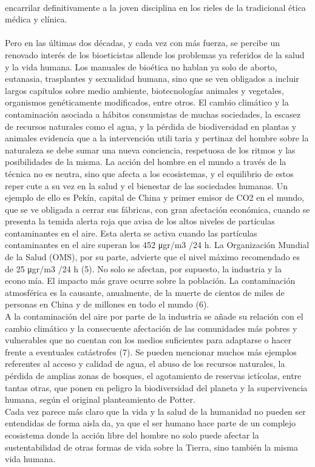 \documentclass[12pt,letterpaper]{article}
\begin{document}
\begin{multicols}{2}
\\
\noindent encarrilar definitivamente a la joven disciplina en los rieles de la tradicional ética médica y clínica.
\\
\\
Pero en las últimas dos décadas, y cada vez con más 
fuerza, se percibe un renovado interés de los bioeticistas allende los problemas ya referidos de la salud y la vida humana. Los manuales de bioética no hablan ya solo de aborto, eutanasia, trasplantes y sexualidad humana, sino que se ven obligados a incluir largos capítulos sobre medio ambiente, biotecnologías animales y vegetales, organismos genéticamente modificados, entre otros. El cambio climático y la contaminación asociada a hábitos 
consumistas de muchas sociedades, la escasez de recursos naturales como el agua, y la pérdida de biodiversidad en plantas y animales evidencia que a la intervención utilitaria y pertinaz del hombre sobre la naturaleza se debe sumar una nueva conciencia, respetuosa de los ritmos y las posibilidades de la misma. La acción del hombre en el mundo a través de la técnica no es neutra, sino que afecta a los ecosistemas, y el equilibrio de estos repercute a su vez en la salud y el bienestar de las sociedades humanas. Un ejemplo de ello es Pekín, capital de China y primer emisor de CO2 en el mundo, que se ve obligada a cerrar sus fábricas, con gran afectación económica, cuando se presenta la temida alerta roja que avisa de los altos niveles de partículas contaminantes en el aire. Esta alerta se activa cuando las partículas contaminantes en el aire superan los 452 μgr/m3
/24 h. La Organización Mundial de la Salud (OMS), por su parte, advierte que el nivel máximo recomendado es de 25 μgr/m3
/24 h (5). No solo se afectan, por supuesto, la industria y la economía. El impacto más grave ocurre sobre la población. La contaminación atmosférica es la causante, anualmente, de la muerte de cientos de miles de personas en China y de millones en todo el mundo (6).
\\

\noindent A la contaminación del aire por parte de la industria se añade su relación con el cambio climático y la consecuente afectación de las comunidades más pobres y vulnerables que no cuentan con los medios suficientes para adaptarse o hacer frente a eventuales catástrofes (7). Se pueden mencionar muchos más ejemplos referentes al acceso y calidad de agua, el abuso de los recursos naturales, la pérdida de amplias zonas de bosques, el agotamiento de reservas ictícolas, entre tantas otras, que ponen en peligro la biodiversidad del planeta y la supervivencia humana, según el original planteamiento de Potter.
\\

\noindent Cada vez parece más claro que la vida y la salud de la humanidad no pueden ser entendidas de forma aislada, ya que el ser humano hace parte de un complejo ecosistema donde la acción libre del hombre no solo puede afectar la sustentabilidad de otras formas de vida sobre la Tierra, sino también la misma vida humana.
\end{multicols}
\newpage
\end{document}
